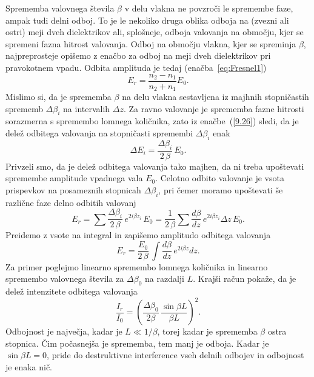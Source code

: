 Sprememba valovnega števila $\beta$ v delu vlakna ne povzroči le spremembe faze, 
ampak tudi delni odboj.
To je le nekoliko druga oblika odboja na (zvezni ali ostri) meji 
dveh dielektrikov ali, splošneje, odboja valovanja na območju,
kjer se spremeni fazna hitrost valovanja.
Odboj na območju vlakna, kjer se spreminja $\beta$, najpreprosteje opišemo 
z enačbo za odboj na meji dveh dielektrikov pri pravokotnem
vpadu. Odbita amplituda je tedaj (enačba~\ref{eq:Fresnel1})
\begin{equation}
E_{r}=\frac{n_{2}-n_{1}}{n_{2}+n_{1}}E_{0}.
\label{9.26}
\end{equation}
Mislimo si, da je sprememba $\beta$ na delu vlakna sestavljena iz
majhnih stopničastih sprememb $\Delta\beta_{i}$ na intervalih $\Delta z$.
Za ravno valovanje je sprememba fazne hitrosti sorazmerna s spremembo
lomnega količnika, zato iz enačbe~(\ref{9.26}) sledi, da je delež odbitega
valovanja na stopničasti spremembi $\Delta\beta_{i}$ enak
\begin{equation}
\Delta E_{i}=\frac{\Delta\beta_{i}}{2\,\beta}\, E_{0}.
\label{9.27}
\end{equation}
Privzeli smo, da je delež odbitega valovanja tako majhen, da ni treba upoštevati 
spremembe amplitude vpadnega vala $E_{0}$. Celotno odbito valovanje je vsota 
prispevkov na posameznih stopnicah $\Delta\beta_{i}$,
pri čemer moramo upoštevati še različne faze delno odbitih valovanj
\begin{equation}
E_{r}=\sum\frac{\Delta\beta_{i}}{2\,\beta}\, e^{2i\beta z_{i}}\, 
E_{0}=\frac{1}{2\,\beta}\sum\frac{d\beta}{dz}\, e^{2i\beta z_{i}}\Delta z\, E_{0}.
\label{9.28}
\end{equation}
Preidemo z vsote na integral in zapišemo amplitudo odbitega valovanja
\begin{equation}
E_{r}=\frac{E_{0}}{2\,\beta}\,\int\frac{d\beta}{dz}\, e^{2i\beta z}dz.
\label{9.29}
\end{equation}
Za primer poglejmo linearno spremembo lomnega količnika in linearno spremembo 
valovnega števila za $\Delta\beta_{0}$ na razdalji $L$. Krajši račun pokaže, da je 
delež intenzitete odbitega valovanja 
\begin{equation}
\frac{I_{r}}{I_{0}}=\left( \frac{\Delta\beta_{0}}{2 \beta}\,\frac{\sin\beta L}{\beta L}\right)^2.
\label{9.30}
\end{equation}
Odbojnost je največja, kadar je $L \ll 1/\beta$,
torej kadar je sprememba $\beta$ ostra stopnica. Čim počasnejša je
sprememba, tem manj je odboja. Kadar je $\sin\beta L=0$, pride do destruktivne 
interference vseh delnih odbojev in odbojnost je enaka nič.

